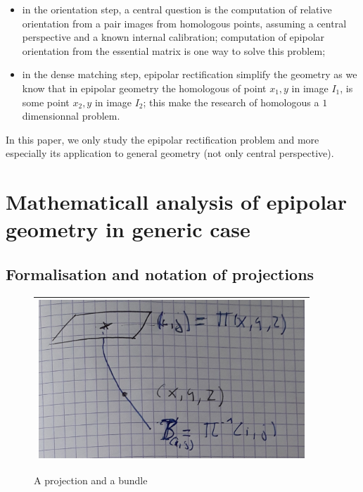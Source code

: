 \documentclass[a4paper]{article}
\begin{document}
\begin{itemize}
   \item in the orientation step,  a central question is the computation of
      relative orientation from a pair images from homologous points, assuming a central perspective and
      a known internal calibration; computation of epipolar orientation from the essential matrix
      is one way to solve this problem;

   \item in the dense matching  step, epipolar rectification simplify the geometry as we know
        that in epipolar geometry the homologous of point $x_1,y$ in image $I_1$, is some point
        $x_2,y$ in image $I_2$; this make the research of homologous a $1$ dimensionnal problem.

\end{itemize}

In this paper, we only study  the epipolar rectification problem and more especially
its application to general geometry (not only central perspective).


\section{Mathematicall analysis of epipolar geometry in generic case}

\subsection{Formalisation and notation of projections}

\begin{figure}
\centering
\begin{tabular}{||c||}
 \hline \hline
\includegraphics[width=10cm]{FIGS/NotaProj.jpg} 
 \\ \hline \hline
\end{tabular}
\caption{A projection and a bundle}
\label{FigNotaProj}
\end{figure}
\end{document}
